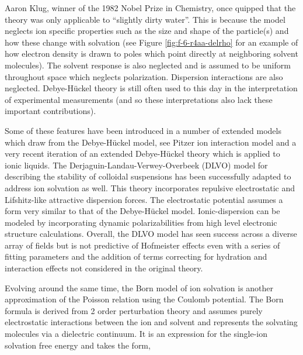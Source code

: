 \begin{intro}
    Aaron Klug, winner of the 1982 Nobel Prize in Chemistry, once quipped that the theory was only applicable to ``slightly dirty water''\cite{parsons2011hofmeister}. This is
    because the model neglects ion specific properties such as the size and shape of the particle(s) and how these change with solvation (see Figure \ref{fig:f-6-r4aa-delrho} 
    for an example of how electron density is drawn to poles which point directly at neighboring solvent molecules). The solvent response is also neglected and is assumed to 
    be uniform throughout space which neglects polarization. Dispersion interactions are also neglected. Debye-H\"{u}ckel theory is still often used to this day in the 
    interpretation of experimental measurements (and so these interpretations also lack these important contributions)\cite{peruzzi2012hofmeister,ribeiro2013salt}.
    
    Some of these features have been introduced in a number of extended models which draw from the Debye-H\"{u}ckel model, see Pitzer ion interaction 
    model\cite{pitzer1977electrolyte} and a very recent iteration of an extended Debye-H\"{u}ckel theory\cite{xiao2011molecular,xiao2015extended} which is applied to ionic liquids. 
    The Derjaguin-Landau-Verwey-Overbeek (DLVO) model for describing the stability of colloidal suspensions has been successfully adapted to address ion solvation as well. 
    This theory incorporates repulsive electrostatic and Lifshitz-like attractive dispersion forces. The electrostatic potential assumes a form very similar to that of the 
    Debye-H\"{u}ckel model. Ionic-dispersion can be modeled by incorporating dynamic polarizabilities from high level electronic structure calculations\cite{parsons2011surface}. 
    Overall, the DLVO model has seen success across a diverse array of fields\cite{parsons2014surface} but is not predictive of Hofmeister effects even with a series of 
    fitting parameters and the addition of terms correcting for hydration and interaction effects not considered in the original theory.

    Evolving around the same time, the Born model of ion solvation is another approximation of the Poisson relation using the Coulomb potential\cite{born1920volumes}. The Born 
    formula is derived from 2 order perturbation theory\cite{tlbbook} and assumes purely electrostatic interactions between the ion and solvent and represents the solvating 
    molecules via a dielectric continuum. It is an expression for the single-ion solvation free energy and takes the form,
    

\end{intro}
